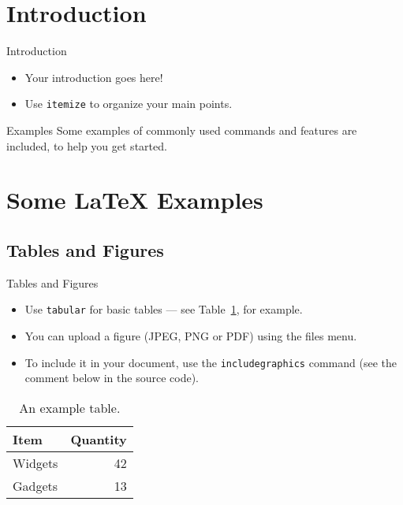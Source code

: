 \section{Introduction}
	
	\begin{frame}{Introduction}
		
		\begin{itemize}
			\item Your introduction goes here!
			\item Use \texttt{itemize} to organize your main points.
		\end{itemize}
		
		\vskip 1cm
		
		\begin{block}{Examples}
			Some examples of commonly used commands and features are included, to help you get started.
		\end{block}
		
	\end{frame}
	
	\section{Some \LaTeX{} Examples}
	
	\subsection{Tables and Figures}
	
	\begin{frame}{Tables and Figures}
		
		\begin{itemize}
			\item Use \texttt{tabular} for basic tables --- see Table~\ref{tab:widgets}, for example.
			\item You can upload a figure (JPEG, PNG or PDF) using the files menu. 
			\item To include it in your document, use the \texttt{includegraphics} command (see the comment below in the source code).
		\end{itemize}
		
		
		\begin{table}
			\centering
			\begin{tabular}{l|r}
				Item & Quantity \\\hline
				Widgets & 42 \\
				Gadgets & 13
			\end{tabular}
			\caption{\label{tab:widgets}An example table.}
		\end{table}
		
	\end{frame}
	
